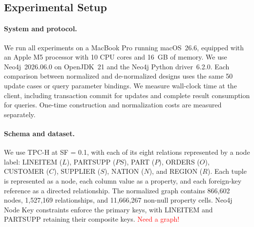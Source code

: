 \documentclass[sigconf]{acmart}
\begin{document}
\subsection{Experimental Setup}

\paragraph{System and protocol.}
We run all experiments on a MacBook Pro running macOS~26.6, equipped with an Apple M5 processor with 10 CPU cores and 16~GB of memory. We use Neo4j~2026.06.0 on OpenJDK~21 and the Neo4j Python driver~6.2.0. Each comparison between normalized and de-normalized designs uses the same 50 update cases or query parameter bindings. We measure wall-clock time at the client, including transaction commit for updates and complete result consumption for queries. One-time construction and normalization costs are measured separately.


\paragraph{Schema and dataset.}
We use TPC-H at SF = 0.1, with each of its eight relations represented by a node label: \textsf{LINEITEM} ($L$), \textsf{PARTSUPP} ($PS$), \textsf{PART} ($P$), \textsf{ORDERS} ($O$), \textsf{CUSTOMER} ($C$), \textsf{SUPPLIER} ($S$), \textsf{NATION} ($N$), and \textsf{REGION} ($R$). Each tuple is represented as a node, each column value as a property, and each foreign-key reference as a directed relationship. The normalized graph contains 866,602 nodes, 1,527,169 relationships, and 11,666,267 non-null property cells. Neo4j Node Key constraints enforce the primary keys, with \textsf{LINEITEM} and \textsf{PARTSUPP} retaining their composite keys.
\textcolor{red}{Need a graph!}
\end{document}
